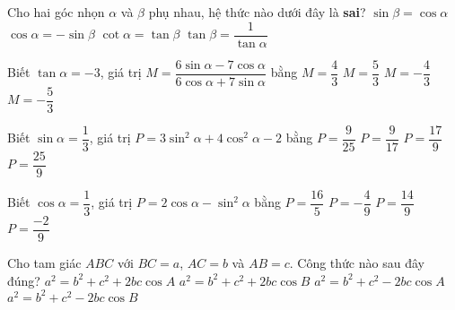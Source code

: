 \begin{ex}%
	Cho hai góc nhọn $\alpha$ và $\beta$ phụ nhau, hệ thức nào dưới đây là \textbf{sai}?
	\choice
	{$\sin\beta=\cos\alpha$}
	{\True $\cos\alpha=-\sin\beta$}
	{$\cot\alpha=\tan\beta$}
	{$\tan\beta=\dfrac{1}{\tan\alpha}$}
\end{ex}
\begin{ex}%
	Biết $\tan\alpha=-3$, giá trị $M=\dfrac{6\sin\alpha-7\cos\alpha}{6\cos\alpha+7\sin\alpha}$ bằng
	\choice
	{$M=\dfrac{4}{3}$}
	{\True $M=\dfrac{5}{3}$}
	{$M=-\dfrac{4}{3}$}
	{$M=-\dfrac{5}{3}$}
\end{ex}
\begin{ex}%
	Biết $\sin\alpha=\dfrac{1}{3}$, giá trị $P=3\sin^2\alpha+4\cos^2\alpha-2$ bằng
	\choice
	{$P=\dfrac{9}{25}$}
	{$P=\dfrac{9}{17}$}
	{\True $P=\dfrac{17}{9}$}
	{$P=\dfrac{25}{9}$}
\end{ex}
\begin{ex}%
	Biết $\cos\alpha=\dfrac{1}{3}$, giá trị $P=2\cos\alpha-\sin^2\alpha$ bằng
	\choice
	{$P=\dfrac{16}{5}$}
	{$P=-\dfrac{4}{9}$}
	{$P=\dfrac{14}{9}$}
	{\True $P=\dfrac{-2}{9}$}
\end{ex}
\begin{ex}%
	Cho tam giác $ABC$ với $BC=a$, $AC=b$ và $AB=c$. Công thức nào sau đây đúng?
	\choice
	{$a^2=b^2+c^2+2bc\cos A$}
	{$a^2=b^2+c^2+2bc\cos B$}
	{\True $a^2=b^2+c^2-2bc\cos A$}
	{$a^2=b^2+c^2-2bc\cos B$}
\end{ex}
